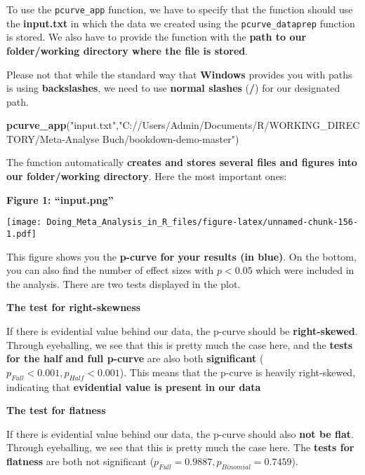 \documentclass[]{book}
\newenvironment{Shaded}{\begin{snugshade}}{\end{snugshade}}
\newcommand{\KeywordTok}[1]{\textcolor[rgb]{0.13,0.29,0.53}{\textbf{#1}}}
\newcommand{\StringTok}[1]{\textcolor[rgb]{0.31,0.60,0.02}{#1}}
\newcommand{\NormalTok}[1]{#1}
\theoremstyle{definition}
\theoremstyle{definition}
\theoremstyle{definition}
\theoremstyle{remark}
\begin{document}
To use the \texttt{pcurve\_app} function, we have to specify that the
function should use the \textbf{input.txt} in which the data we created
using the \texttt{pcurve\_dataprep} function is stored. We also have to
provide the function with the \textbf{path to our folder/working
directory where the file is stored}.

\begin{rmdachtung}
Please not that while the standard way that \textbf{Windows} provides
you with paths is using \textbf{backslashes}, we need to use
\textbf{normal slashes} (\textbf{/}) for our designated path.
\end{rmdachtung}

\begin{Shaded}
\begin{Highlighting}[]
\KeywordTok{pcurve_app}\NormalTok{(}\StringTok{"input.txt"}\NormalTok{,}\StringTok{"C://Users/Admin/Documents/R/WORKING_DIRECTORY/Meta-Analyse Buch/bookdown-demo-master"}\NormalTok{)}
\end{Highlighting}
\end{Shaded}

The function automatically \textbf{creates and stores several files and
figures into our folder/working directory}. Here the most important
ones:

\textbf{Figure 1: ``input.png''}

\texttt{[image: Doing\_Meta\_Analysis\_in\_R\_files/figure-latex/unnamed-chunk-156-1.pdf]}

This figure shows you the \textbf{p-curve for your results (in blue)}.
On the bottom, you can also find the number of effect sizes with
\(p<0.05\) which were included in the analysis. There are two tests
displayed in the plot.

\textbf{The test for right-skewness}

If there is evidential value behind our data, the p-curve should be
\textbf{right-skewed}. Through eyeballing, we see that this is pretty
much the case here, and the \textbf{tests for the half and full p-curve}
are also both \textbf{significant} (\(p_{Full}<0.001, p_{Half}<0.001\)).
This means that the p-curve is heavily right-skewed, indicating that
\textbf{evidential value is present in our data}

\textbf{The test for flatness}

If there is evidential value behind our data, the p-curve should also
\textbf{not be flat}. Through eyeballing, we see that this is pretty
much the case here. The \textbf{tests for flatness} are both not
significant (\(p_{Full}=0.9887, p_{Binomial}=0.7459\)).
\end{document}
